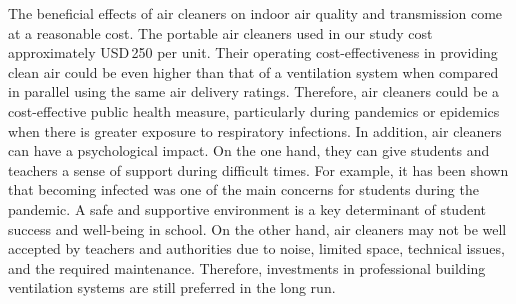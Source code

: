 \documentclass[fleqn,11pt]{wlscirep}
\begin{document}

The beneficial effects of air cleaners on indoor air quality and transmission come at a reasonable cost. The portable air cleaners used in our study cost approximately USD\,250 per unit. Their operating cost-effectiveness in providing clean air could be even higher than that of a ventilation system when compared in parallel using the same air delivery ratings\cite{Noh2016EnBuild}. Therefore, air cleaners could be a cost-effective public health measure, particularly during pandemics or epidemics when there is greater exposure to respiratory infections. In addition, air cleaners can have a psychological impact. On the one hand, they can give students and teachers a sense of support during difficult times. For example, it has been shown that becoming infected was one of the main concerns for students during the pandemic\cite{Yuerekli2022IJERPH}. A safe and supportive environment is a key determinant of student success and well-being in school\cite{Kutsyuruba2015RevEduc}. On the other hand, air cleaners may not be well accepted by teachers and authorities due to noise, limited space, technical issues, and the required maintenance\cite{Sanguinetti2022IndoorAir}. Therefore, investments in professional building ventilation systems are still preferred in the long run\cite{Nardell2016}.

\end{document}

